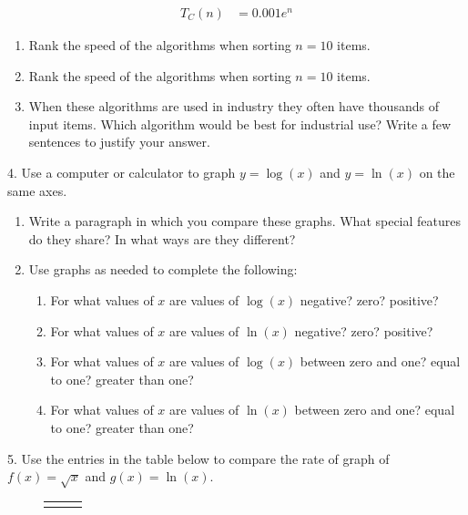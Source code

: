 \documentclass[10pt,]{book}
\theoremstyle{plain}
\theoremstyle{definition}
\theoremstyle{definition}
\theoremstyle{definition}
\numberwithin{equation}{section}
\newcommand{\hrulethick} {\noalign{\hrule height 0.11em}}
\newcommand{\amp}{&}
\begin{document}
\begin{exerciselist}
\begin{align*}
T_C(n) \amp = 0.001e^n
\end{align*}
\leavevmode%
\begin{enumerate}[label=(\alph*)]
\item\hypertarget{li-250}{}Rank the speed of the algorithms when sorting \(n = 10\) items.%
\item\hypertarget{li-251}{}Rank the speed of the algorithms when sorting \(n = 10\) items.%
\item\hypertarget{li-252}{}When these algorithms are used in industry they often have thousands of input items. Which algorithm would be best for industrial use?  Write a few sentences to justify your answer.%
\end{enumerate}
%
\par\smallskip
\item[4.]\hypertarget{exercise-94}{}\hypertarget{p-359}{}%
Use a computer or calculator to graph \(y = \log(x)\) and \(y = \ln(x)\) on the same axes. \leavevmode%
\begin{enumerate}[label=(\alph*)]
\item\hypertarget{li-253}{}Write a paragraph in which you compare these graphs.  What special features do they share?  In what ways are they different?%
\item\hypertarget{li-254}{}\hypertarget{p-360}{}%
Use graphs as needed to complete the following: %
\begin{enumerate}[label=\roman*.]
\item\hypertarget{li-255}{}For what values of \(x\) are values of \(\log(x)\) negative? zero? positive?%
\item\hypertarget{li-256}{}For what values of \(x\) are values of \(\ln(x)\) negative? zero? positive?%
\item\hypertarget{li-257}{}For what values of \(x\) are values of \(\log(x)\) between zero and one? equal to one? greater than one?%
\item\hypertarget{li-258}{}For what values of \(x\) are values of \(\ln(x)\) between zero and one? equal to one? greater than one?%
\end{enumerate}
%
\end{enumerate}
%
\par\smallskip
\item[5.]\hypertarget{exercise-95}{}\hypertarget{p-361}{}%
Use the entries in the table below to compare the rate of graph of \(f(x) = \sqrt{x}\) and \(g(x) = \ln(x)\). \begin{figure}
\centering
\begin{tabular}{ccc}\hrulethick

\end{tabular}
\end{figure}
\end{exerciselist}
\end{document}
